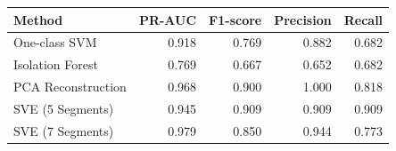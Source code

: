 \begin{tabular}{lrrrr}
\toprule
Method & PR-AUC & F1-score & Precision & Recall \\
\midrule
One-class SVM & 0.918 & 0.769 & 0.882 & 0.682 \\
Isolation Forest & 0.769 & 0.667 & 0.652 & 0.682 \\
PCA Reconstruction & 0.968 & 0.900 & 1.000 & 0.818 \\
SVE (5 Segments) & 0.945 & 0.909 & 0.909 & 0.909 \\
SVE (7 Segments) & 0.979 & 0.850 & 0.944 & 0.773 \\
\bottomrule
\end{tabular}
